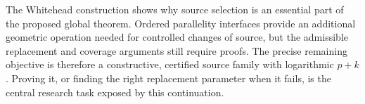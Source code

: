 The Whitehead construction shows why source selection is an essential
part of the proposed global theorem. Ordered parallelity interfaces
provide an additional geometric operation needed for controlled changes
of source, but the admissible replacement and coverage arguments still
require proofs. The precise remaining objective is therefore a
constructive, certified source family with logarithmic $p+k$. Proving it,
or finding the right replacement parameter when it fails, is the central
research task exposed by this continuation.
